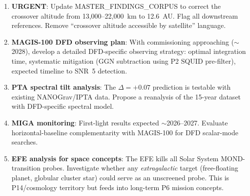 \documentclass[11pt]{article}
\theoremstyle{definition}
\theoremstyle{remark}
\begin{document}
\begin{enumerate}
\item \textbf{URGENT}: Update MASTER\_FINDINGS\_CORPUS to correct
  the crossover altitude from 13,000--22,000~km to 12.6~AU.
  Flag all downstream references. Remove ``crossover altitude
  accessible by satellite'' language.

\item \textbf{MAGIS-100 DFD observing plan}: With commissioning
  approaching ($\sim$2028), develop a detailed DFD-specific
  observing strategy: optimal integration time, systematic
  mitigation (GGN subtraction using P2 SQUID pre-filter),
  expected timeline to SNR~5 detection.

\item \textbf{PTA spectral tilt analysis}: The $\Delta = +0.07$
  prediction is testable with existing NANOGrav/IPTA data.
  Propose a reanalysis of the 15-year dataset with
  DFD-specific spectral model.

\item \textbf{MIGA monitoring}: First-light results expected
  $\sim$2026--2027. Evaluate horizontal-baseline complementarity
  with MAGIS-100 for DFD scalar-mode searches.

\item \textbf{EFE analysis for space concepts}: The EFE kills
  all Solar System MOND-transition probes. Investigate whether
  any \emph{extragalactic} target (free-floating planet, globular
  cluster star) could serve as an unscreened probe. This is
  P14/cosmology territory but feeds into long-term P6 mission
  concepts.
\end{enumerate}
\end{document}
